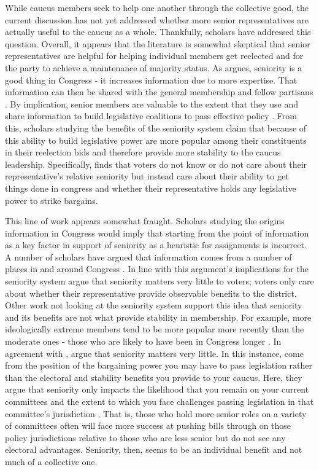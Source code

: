 \documentclass [12pt]{article}
\begin{document}
While caucus members seek to help one another through the collective good, the current discussion has not yet addressed whether more senior representatives are actually useful to the caucus as a whole. Thankfully, scholars have addressed this question. Overall, it appears that the literature is somewhat skeptical that senior representatives are helpful for helping individual members get reelected and for the party to achieve a maintenance of majority status. As  argues, seniority is a good thing in Congress - it increases information due to more expertise. That information can then be shared with the general membership and fellow partisans \cite{Krehbiel1991}. By implication, senior members are valuable to the extent that they use and share information to build legislative coalitions to pass effective policy \cite{Taylor2019}. From this, scholars studying the benefits of the seniority system claim that because of this ability to build legislative power are more popular among their constituents in their reelection bids and therefore provide more stability to the caucus leadership. Specifically,  finds that voters do not know or do not care about their representative's relative seniority but instead care about their ability to get things done in congress and whether their representative holds any legislative power to strike bargains. 

This line of work appears somewhat fraught. Scholars studying the origins information in Congress would imply that starting from the point of information as a key factor in support of seniority as a heuristic for assignments is incorrect. A number of scholars have argued that information comes from a number of places in and around Congress \cite{Austen-Smith1993,Hall2006,McCrain2018}. In line with this argument's implications for the seniority system  argue that seniority matters very little to voters; voters only care about whether their representative provide observable benefits to the district. Other work not looking at the seniority system support this idea that seniority and its benefits are not what provide stability in membership. For example, more ideologically extreme members tend to be more popular more recently than the moderate ones - those who are likely to have been in Congress longer \cite{Utych2019}. In agreement with ,  argue that seniority matters very little. In this instance,  come from the position of the bargaining power you may have to pass legislation rather than the electoral and stability benefits you provide to your caucus. Here, they argue that seniority only impacts the likelihood that you remain on your current committees and the extent to which you face challenges passing legislation in that committee's jurisdiction \cite{Kellermann2009}. That is, those who hold more senior roles on a variety of committees often will face more success at pushing bills through on those policy jurisdictions relative to those who are less senior but do not see any electoral advantages. Seniority, then, seems to be an individual benefit and not much of a collective one.
\end{document}
